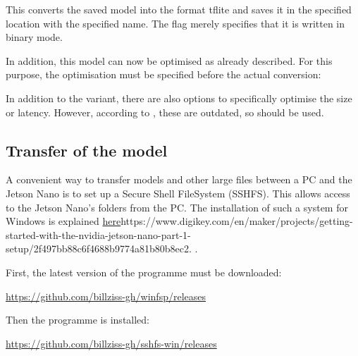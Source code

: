 

\medskip

This converts the saved model into the format tflite and saves it in the specified location with the specified name. \cite{Google.04.11.2020} The flag  merely specifies that it is written in binary mode.

In addition, this model can now be optimised as already described. For this purpose, the optimisation must be specified \cite{Warden:2020} before the actual conversion:

\medskip


\medskip

In addition to the  variant, there are also options to specifically optimise the size or latency. However, according to \cite{Google.13.01.2021}, these are outdated, so  should be used.

\subsection{Transfer of the model}

A convenient way to transfer models and other large files between a PC and the Jetson Nano is to set up a Secure Shell FileSystem (SSHFS). This allows access to the Jetson Nano's folders from the PC. The installation of such a system for Windows is explained \url{here}{https://www.digikey.com/en/maker/projects/getting-started-with-the-nvidia-jetson-nano-part-1-setup/2f497bb88c6f4688b9774a81b80b8ec2}.  .

First, the latest version of the programme  must be downloaded:


\medskip

\url{https://github.com/billziss-gh/winfsp/releases}


\medskip

Then the programme  is installed: 

\medskip

\url{https://github.com/billziss-gh/sshfs-win/releases}



